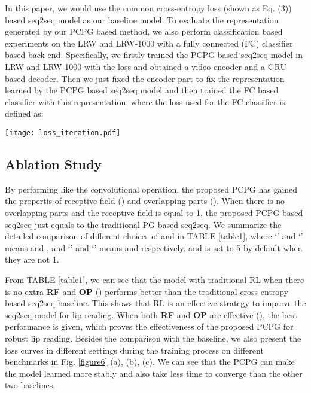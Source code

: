 \documentclass[a4paper, 10pt, conference]{ieeeconf}      \usepackage{FG2020}
\begin{document}
In this paper, we would use the common cross-entropy loss  (shown as Eq. (3)) based seq2seq model as our baseline model.
To evaluate the representation generated by our PCPG based method, we also perform classification based experiments on the LRW and LRW-1000 with a fully connected (FC) classifier based back-end. Specifically, we firstly trained the PCPG based seq2seq model in LRW and LRW-1000 with the loss  and obtained a video encoder and a GRU based decoder. Then we just fixed the encoder part to fix the representation learned by the PCPG based seq2seq model and then trained the FC based classifier with this representation, where the loss used for the FC classifier  is defined as:

\begin{figure*}
	\centering
\setlength{\abovecaptionskip}{-0.00cm}   \setlength{\belowcaptionskip}{-0.00cm} 
	\texttt{[image: loss\_iteration.pdf]}
	\caption{loss v.s. iteration on GRID, LRW, LRW-1000. The three vertical lines (blue, green, red) in (a), (b) and (c) refer to the state when the model converges under different conditions.} \label{figure6}
\end{figure*}
\vspace{-0.6cm}
\subsection{Ablation Study}
By performing like the convolutional operation, the proposed PCPG has gained the propertis of receptive field () and overlapping parts (). When there is no overlapping parts and the receptive field is equal to 1, the proposed PCPG based seq2seq just equals to the traditional PG based seq2seq.  We summarize the detailed comparison of different choices of  and  in TABLE \ref{table1}, where `' and `' means  and ,  and `' and `' means  and  respectively.  and  is set to 5 by default when they are not 1. 

From TABLE \ref{table1}, we can see that the model with traditional RL when there is no extra \textbf{RF} and \textbf{OP} () performs better than the traditional cross-entropy based seq2seq baseline. This shows that RL is an effective strategy to improve the seq2seq model for lip-reading.
When both \textbf{RF} and \textbf{OP} are effective (), the best performance is given, which proves the effectiveness of the proposed PCPG for robust lip reading. Besides the comparison with the baseline, we also present the loss curves in different settings during the training process on different benchmarks in Fig. \ref{figure6} (a), (b), (c). We can see that the PCPG can make the model learned more stably and also take less time to converge than the other two baselines.
\vspace{-0.16cm}
\end{document}
